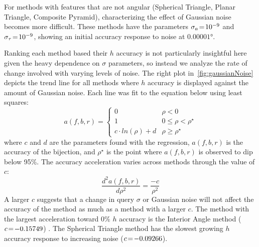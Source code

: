 For methods with features that are not angular (Spherical Triangle, Planar Triangle, Composite Pyramid),
characterizing the effect of Gaussian noise becomes more difficult.
These methods have the parameters $\sigma_a \!=\! 10^{-9}$ and $\sigma_\tau \!=\! 10^{-9}$, showing an initial
accuracy response to noise at $\ang{0.00001}$.

Ranking each method based their $h$ accuracy is not particularly insightful here given the heavy dependence on
$\sigma$ parameters, so instead we analyze the rate of change involved with varying levels of noise.
The right plot in~\autoref{fig:gaussianNoise} depicts the trend line for all methods where $h$ accuracy is displayed
against the amount of Gaussian noise.
Each line was fit to the equation below using least squares:
\begin{equation}
    a(f, b, r) =
    \begin{cases}
        0 & \rho < 0 \\
        1 & 0 \leq \rho < \rho^{\star} \\
        c \cdot \mathit{ln}(\rho) + d & \rho \geq \rho^{\star}
    \end{cases}
\end{equation}
where $c$ and $d$ are the parameters found with the regression, $a(f, b, r)$ is the accuracy of the bijection, and
$\rho^{\star}$ is the point where $a(f, b, r)$ is observed to dip below 95\%.
The accuracy acceleration varies across methods through the value of $c$:
\begin{equation}
    \frac{d^{2}a(f, b, r)}{d\rho^2} = \frac{-c}{\rho^2}
\end{equation}
A larger $c$ suggests that a change in query $\sigma$ or Gaussian noise will not affect the accuracy of the method
as much as a method with a larger $c$.
The method with the largest acceleration toward $0\%$ $h$ accuracy is the Interior Angle method ($c \!=\! -0.15749$) .
The Spherical Triangle method has the slowest growing $h$ accuracy response to increasing noise ($c \!=\! -0.09266$).

\begin{figure*}
\end{figure*}

